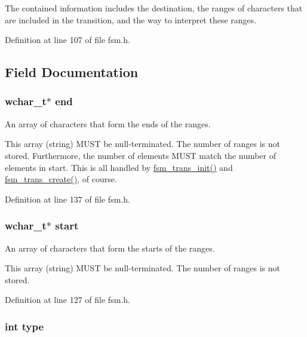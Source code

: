 \-The contained information includes the destination, the ranges of characters that are included in the transition, and the way to interpret these ranges. 

\-Definition at line 107 of file fsm.\-h.



\subsection{\-Field \-Documentation}
\hypertarget{structfsm__trans_aa1e2bbde6a40f4d42da0674048ea3099}{
\subsubsection[{end}]{\setlength{\rightskip}{0pt plus 5cm}wchar\-\_\-t$\ast$ {\bf end}}}\label{structfsm__trans_aa1e2bbde6a40f4d42da0674048ea3099}


\-An array of characters that form the ends of the ranges. 

\-This array (string) \-M\-U\-S\-T be null-\/terminated. \-The number of ranges is not stored. \-Furthermore, the number of elements \-M\-U\-S\-T match the number of elements in start. \-This is all handled by \hyperlink{fsm_2datastructs_8c_a1ee5d4d7276a5ca86ba5f9f2947a2a57}{fsm\-\_\-trans\-\_\-init()} and \hyperlink{fsm_2datastructs_8c_a96f9a93d3836ac3b7e60e5d07c8fd953}{fsm\-\_\-trans\-\_\-create()}, of course. 

\-Definition at line 137 of file fsm.\-h.

\hypertarget{structfsm__trans_a57644b772e7a7502cf7bae92933f1dee}{
\subsubsection[{start}]{\setlength{\rightskip}{0pt plus 5cm}wchar\-\_\-t$\ast$ {\bf start}}}\label{structfsm__trans_a57644b772e7a7502cf7bae92933f1dee}


\-An array of characters that form the starts of the ranges. 

\-This array (string) \-M\-U\-S\-T be null-\/terminated. \-The number of ranges is not stored. 

\-Definition at line 127 of file fsm.\-h.

\hypertarget{structfsm__trans_ac765329451135abec74c45e1897abf26}{
\subsubsection[{type}]{\setlength{\rightskip}{0pt plus 5cm}int {\bf type}}}\label{structfsm__trans_ac765329451135abec74c45e1897abf26}


